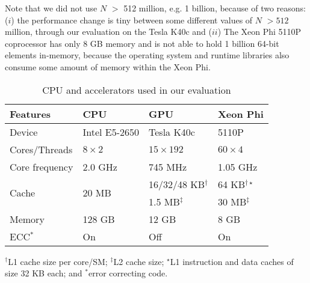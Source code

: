 \documentclass[article]{elsarticle}
\renewcommand{\hl}[1]{#1}
\begin{document}
{\hl{Note that we did not use $N$ $>$ 512 million, e.g. 1 billion, because of two reasons: ($i$) the performance change is tiny between some different values of $N$ $>512$ million, through our evaluation on the Tesla K40c and ($ii$) The Xeon Phi 5110P coprocessor has only 8 GB memory and is not able to hold 1 billion 64-bit elements in-memory, because the operating system and runtime libraries also consume some amount of memory within the Xeon Phi.}
\begin{table}[!h]
\caption{CPU and accelerators used in our evaluation}
\label{tab:processing_units}
\centering
\begin{threeparttable}
\begin{tabular}{|l||l||l||l|}
\hline
\textbf{Features} &\textbf{CPU}&	\textbf{GPU}&	\textbf{Xeon Phi}\\
\hline
Device& Intel E5-2650&	 Tesla K40c&	5110P\\ 
\hline
Cores/Threads&	$8\times2$&	$15\times192$&	$60\times4$\\
\hline
Core frequency&	2.0 GHz&	745 MHz	&		1.05 GHz\\
\hline
\multirow{2}{*}{Cache}&	\multirow{2}{*}{20 MB}&	16/32/48 KB$^\dagger$&	64 KB$^{\dagger\star}$\\
\hhline{~~--}
&	&	1.5 MB$^\ddagger$ &		30 MB$^\ddagger$\\
\hline
Memory&	128 GB&	12 GB&	8 GB\\
\hline
ECC$^*$&	On&		Off&	On\\
\hline
\end{tabular}
\begin{tablenotes}
\item $^\dagger$L1 cache size per core/SM; $^\ddagger$L2 cache size; $^\star$L1 instruction and data caches of size 32 KB each; and $^*$error correcting code.
\end{tablenotes}
\end{threeparttable}
\end{table}

}
\end{document}
